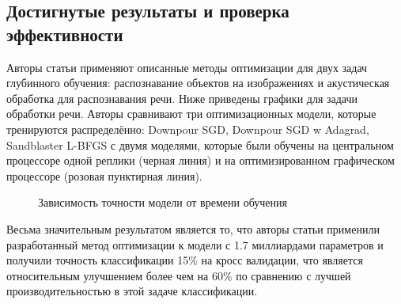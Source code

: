 \subsection{Достигнутые результаты и проверка эффективности}
\indent\setlength{\parindent}{1em} 
Авторы статьи применяют описанные методы оптимизации для двух задач глубинного обучения: распознавание объектов на изображениях и акустическая обработка для распознавания речи.
Ниже приведены графики для задачи обработки речи. Авторы сравнивают три оптимизационных модели, которые тренируются распределённо: Downpour SGD, Downpour SGD w Adagrad, Sandblaster L-BFGS с двумя моделями, которые были обучены на центральном процессоре одной реплики (черная линия) и на оптимизированном графическом процессоре (розовая пунктирная линия).
\begin{figure}[h]%
	\centering
	\caption{Зависимость точности модели от времени обучения}
	\label{framework} %
\end{figure}

\indent\setlength{\parindent}{1em} 
Весьма значительным результатом является то, что авторы статьи применили разработанный метод оптимизации к модели с 1.7 миллиардами параметров и получили точность классификации 15\% на кросс валидации, что является относительным улучшением более чем на 60\% по сравнению с лучшей производительностью в этой задаче классификации.

